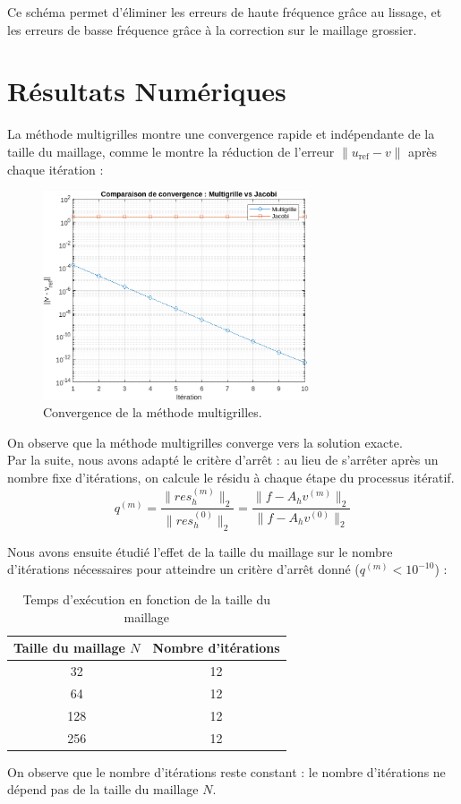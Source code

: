 \documentclass[12pt,a4paper]{article}
\begin{document}
Ce schéma permet d'éliminer les erreurs de haute fréquence grâce au lissage, et les erreurs de basse fréquence grâce à la correction sur le maillage grossier.


\section{Résultats Numériques}

La méthode multigrilles montre une convergence rapide et indépendante de la taille du maillage, comme le montre la réduction de l'erreur $\|u_\text{ref} - v\|$ après chaque itération :

\begin{figure}[H]
    \centering
    \includegraphics[width=0.7\textwidth]{src/convergence.png}
    \caption{Convergence de la méthode multigrilles.}
    \label{fig:multigrid_convergence}
\end{figure}

On observe que la méthode multigrilles converge vers la solution exacte. \\

Par la suite, nous avons adapté le critère d'arrêt : au lieu de s'arrêter après un nombre fixe d'itérations, on calcule le résidu à chaque étape du processus itératif.
$$
q^{(m)} = \frac{\|res^{(m)}_h \|_ 2}{\|res^{(0)}_h \|_2} = \frac{\|f - A_h v^{(m)} \|_2}{\|f - A_h v^{(0)} \|_2}
$$

Nous avons ensuite étudié l'effet de la taille du maillage sur le nombre d'itérations nécessaires pour atteindre un critère d'arrêt donné ($q^{(m)} < 10^{-10}$) :

\begin{table}[H]
    \centering
    \begin{tabular}{|c|c|}
        \hline
        \rowcolor{gray!20} \textbf{Taille du maillage $N$} & \textbf{Nombre d'itérations} \\
        \hline
        32 & 12 \\
64 & 12 \\
128 & 12 \\
256 & 12 \\
        \hline
    \end{tabular}
    \caption{Temps d'exécution en fonction de la taille du maillage}
    \label{tab:execution_time}
\end{table}

On observe que le nombre d'itérations reste constant : le nombre d'itérations ne dépend pas de la taille du maillage $N$.
\end{document}
